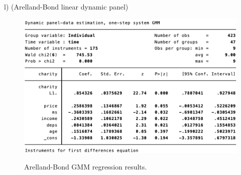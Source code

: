 \documentclass[12pt]{article}
\begin{document}
\newpage

l) (Arelland-Bond linear dynamic panel)

\begin{figure}[h!]
\begin{center}
\includegraphics[scale=0.85]{GMM.png}
\label{}
\caption{Arelland-Bond GMM regression results.}
\end{center}
\end{figure}
\end{document}
